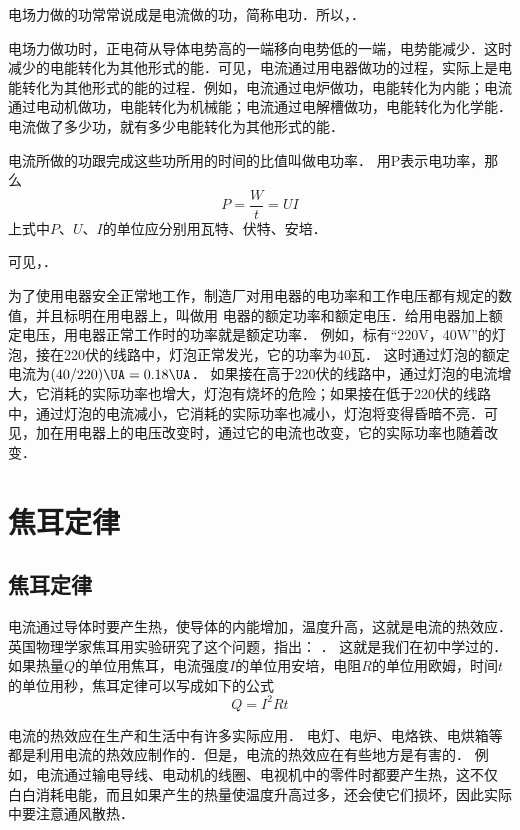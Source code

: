 电场力做的功常常说成是电流做的功，简称电功．所以，．

电场力做功时，正电荷从导体电势高的一端移向电势低的一端，电势能减少．这时减少的电能转化为其他形式的能．可见，电流通过用电器做功的过程，实际上是电能转化为其他形式的能的过程．例如，电流通过电炉做功，电能转化为内能；电流通过电动机做功，电能转化为机械能；电流通过电解槽做功，电能转化为化学能．电流做了多少功，就有多少电能转化为其他形式的能．

电流所做的功跟完成这些功所用的时间的比值叫做电功率．
用P表示电功率，那么
\[P=\frac{W}{t}=UI\]
上式中$P$、$U$、$I$的单位应分别用瓦特、伏特、安培．

可见，．

为了使用电器安全正常地工作，制造厂对用电器的电功率和工作电压都有规定的数值，并且标明在用电器上，叫做用
电器的额定功率和额定电压．给用电器加上额定电压，用电器正常工作时的功率就是额定功率．
例如，标有“220V，40W”的灯泡，接在220伏的线路中，灯泡正常发光，它的功率为40瓦．
这时通过灯泡的额定电流为$(40/220) \UA =0.18 \UA $．
如果接在高于220伏的线路中，通过灯泡的电流增大，它消耗的实际功率也增大，灯泡有烧坏的危险；如果接在低于220伏的线路中，通过灯泡的电流减小，它消耗的实际功率也减小，灯泡将变得昏暗不亮．可见，加在用电器上的电压改变时，通过它的电流也改变，它的实际功率也随着改变．

\section{焦耳定律}
\subsection{焦耳定律}


电流通过导体时要产生热，使导体的内能增加，温度升高，这就是电流的热效应．
英国物理学家焦耳用实验研究了这个问题，指出：
．
这就是我们在初中学过的．如果热量$Q$的单位用焦耳，电流强度$I$的单位用安培，电阻$R$的单位用欧姆，时间$t$的单位用秒，焦耳定律可以写成如下的公式
\[Q=I^2Rt\]

电流的热效应在生产和生活中有许多实际应用．
电灯、电炉、电烙铁、电烘箱等都是利用电流的热效应制作的．但是，电流的热效应在有些地方是有害的．
例如，电流通过输电导线、电动机的线圈、电视机中的零件时都要产生热，这不仅
白白消耗电能，而且如果产生的热量使温度升高过多，还会使它们损坏，因此实际中要注意通风散热．

